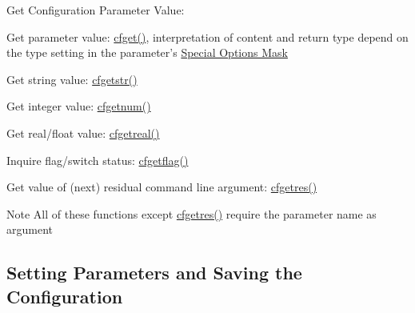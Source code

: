 \begin{DoxyEnumerate}
\item Get Configuration Parameter Value\-:
\end{DoxyEnumerate}


\begin{DoxyItemize}
\item Get parameter value\-: \hyperlink{group__retrieval_ga5e2da3f6cf3e36a910362660d167f790}{cfget()}, interpretation of content and return type depend on the type setting in the parameter's \hyperlink{group__special__options__mask}{Special Options Mask}
\begin{DoxyItemize}
\item Get string value\-: \hyperlink{group__retrieval_ga8cf5f53c5b05ec5ca4f5145010f84eb4}{cfgetstr()}
\item Get integer value\-: \hyperlink{group__retrieval_ga591b741a05205e1ddd599146b996d755}{cfgetnum()}
\item Get real/float value\-: \hyperlink{group__retrieval_ga5f5ec5179e69c2bdfb06ff38a5af16e4}{cfgetreal()}
\item Inquire flag/switch status\-: \hyperlink{group__retrieval_gac0188464b59267e14b5c44efb1d4a0f2}{cfgetflag()}
\item Get value of (next) residual command line argument\-: \hyperlink{group__retrieval_ga6ef6076e946383ab198ee26b9aa5603a}{cfgetres()}
\end{DoxyItemize}
\end{DoxyItemize}

\begin{DoxyNote}{Note}
All of these functions except \hyperlink{group__retrieval_ga6ef6076e946383ab198ee26b9aa5603a}{cfgetres()} require the parameter name as argument
\end{DoxyNote}
\hypertarget{index_set_save}{}\subsection{Setting Parameters and Saving the Configuration}\label{index_set_save}

